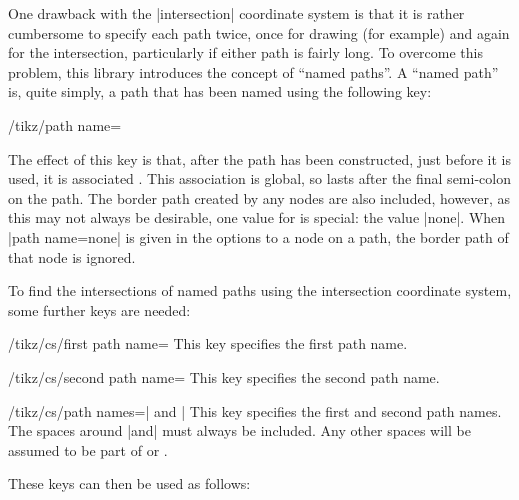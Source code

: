   One drawback with the |intersection| coordinate system is that
  it is rather cumbersome to specify each path twice, once for drawing
  (for example) and again for the intersection, particularly if
  either path is fairly long. To overcome this problem, this library 
  introduces the concept of ``named paths''. A ``named path'' is, 
  quite simply, a path that has been named using the following key:
  
\begin{key}{/tikz/path name=}

	The effect of this key is that, after the path has been constructed,
  just before it is used, it is associated . This 
  association is global, so lasts after the final semi-colon on the
  path.  
  The border path created by any nodes are also included, however,
  as this may not always be desirable, one value for  
  is special: the value |none|. When |path name=none| is given 
  in the options to a node on a path, the border path of that node 
  is ignored. 
 
\end{key}

  To find the intersections of named paths using the intersection 
  coordinate system, some further keys are needed:
  
\begin{key}{/tikz/cs/first path name=}
  This key specifies the first path name.
\end{key}

\begin{key}{/tikz/cs/second path name=}
  This key specifies the second path name.
\end{key}

\begin{key}{/tikz/cs/path names=| and |}
  This key specifies the first and second path names. The spaces
  around |and| must always be included. Any other spaces will
  be assumed to be part of  or .
\end{key}

These keys can then be used as follows:
  
\begin{codeexample}[]
\end{codeexample}

